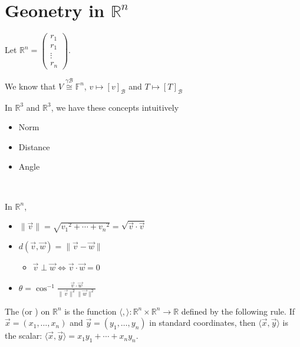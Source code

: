 \documentclass[11pt,fleqn]{book} %
\begin{document}
\section{Geonetry in $\mathbb{R}^n$}

Let $\mathbb{R}^n = \begin{pmatrix} r_1 \\ r_1 \\ \vdots \\ r_n \end{pmatrix}$.

\noindent We know that $V \overset{\gamma\mathcal{B}}{\cong} \mathbb{F}^n$, $v \mapsto [v]_\mathcal{B}$ and $T \mapsto [T]_\mathcal{B}$

\noindent In $\mathbb{R}^3$ and $\mathbb{R}^3$, we have these concepts intuitively
\begin{itemize}
    \item Norm
    \item Distance
    \item Angle
\end{itemize}

{~~~}

\noindent In $\mathbb{R}^n$,
\begin{itemize}
    \item $\|\vec{v}\| = \sqrt{{v_1}^2 + \cdots + {v_n}^2} = \sqrt{\vec{v} \cdot \vec{v}}$
    \item $d(\vec{v}, \vec{w}) = \|\vec{v} - \vec{w}\|$
    \begin{itemize}
        \item $\vec{v} \perp \vec{w} \iff \vec{v} \cdot \vec{w} = 0$
    \end{itemize}
    \item $\theta = \cos^{-1}\frac{\vec{v} \cdot \vec{w}}{\|\vec{v}\|^2 \|\vec{w}\|^2}$
\end{itemize}

\setcounter{chapter}{4}\label{Def4_3_1}
\begin{definition}
    The  (or ) on $\mathbb{R}^n$ is the function $\langle , \rangle : \mathbb{R}^n \times \mathbb{R}^n \to \mathbb{R}$ defined by the following rule. If $\vec{x} = (x_1, \dots, x_n)$ and $\vec{y} =  (y_1, \dots, y_n)$ in standard coordinates, then $\langle \vec{x}, \vec{y} \rangle$ is the scalar: $\langle \vec{x}, \vec{y} \rangle = x_1y_1 + \cdots + x_ny_n$.
\end{definition}
\setcounter{chapter}{3}
\end{document}
